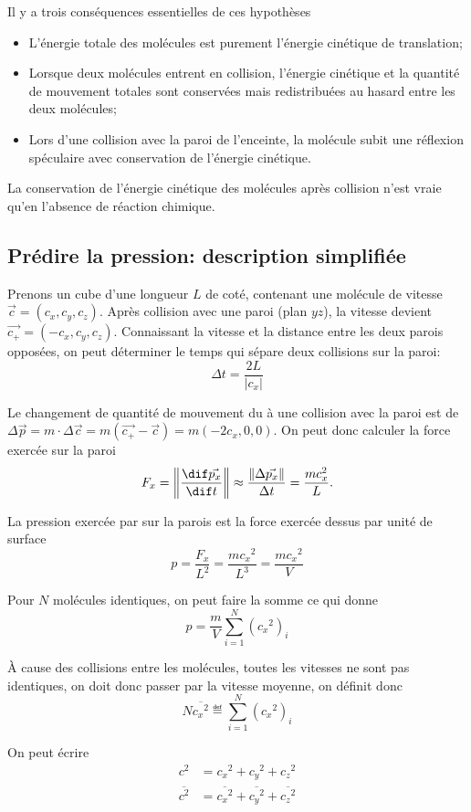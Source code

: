 Il y a trois conséquences essentielles de ces hypothèses
\begin{itemize}
  \item L'énergie totale des molécules est purement
    l'énergie cinétique de translation;
  \item Lorsque deux molécules entrent en collision,
    l'énergie cinétique et la quantité de mouvement totales sont
    conservées mais redistribuées au hasard entre les deux molécules;
  \item Lors d'une collision avec la paroi de l'enceinte,
    la molécule subit une réflexion spéculaire avec conservation
    de l'énergie cinétique.
\end{itemize}
La conservation de l'énergie cinétique des molécules après collision
n'est vraie qu'en l'absence de réaction chimique.

\subsection{Prédire la pression: description simplifiée}
Prenons un cube d'une longueur $L$ de coté,
contenant une molécule de vitesse $\vec{c} = (c_x, c_y, c_z)$.
Après collision avec une paroi (plan $yz$),
la vitesse devient $\vec{c_+} = (-c_x, c_y, c_z)$.
Connaissant la vitesse et la distance entre les deux parois opposées,
on peut déterminer le temps qui sépare deux collisions sur la paroi:
\[ \Delta t = \frac{2L}{|c_x|} \]

Le changement de quantité de mouvement du à une collision avec
la paroi est de $\Delta \vec{p} = m \cdot \Delta \vec{c}
= m (\vec{c_+} - \vec{c}) = m(-2c_x, 0, 0)$.
On peut donc calculer la force exercée sur la paroi
\[ F_x = \left\|\frac{\dif \vec{p_x}}{\dif t}\right\| \approx
\frac{\|\Delta \vec{p_x}\|}{\Delta t} = \frac{mc_x^2}{L}. \]

La pression exercée par  sur la parois est
la force exercée dessus par unité de surface
\[ p = \frac{F_x}{L^2} = \frac{m{c_x}^2}{L^3} = \frac{m{c_x}^2}{V} \]

Pour $N$ molécules identiques, on peut faire la somme ce qui donne
\[ p = \frac{m}{V} \sum_{i=1}^{N}{({c_x}^2)_i} \]

À cause des collisions entre les molécules,
toutes les vitesses ne sont pas identiques,
on doit donc passer par la vitesse moyenne, on définit donc
\[ N \overline{{c_x}^2} \eqdef \sum_{i=1}^{N}{({c_x}^2)_i} \]

On peut écrire
\begin{align*}
  c^2 & = {c_x}^2 + {c_y}^2 + {c_z}^2\\
  \overline{c^2} & =
  \overline{{c_x}^2} + \overline{{c_y}^2} + \overline{{c_z}^2}
\end{align*}

